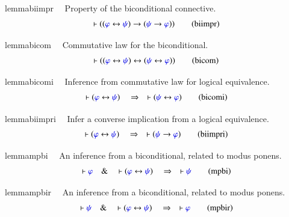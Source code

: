 \begin{restatable}{lemma}{biimpr}~~ Property of the biconditional connective. 
\begin{align}
\vdash ( ( \mw{\varphi} \leftrightarrow \mw{\psi} ) \rightarrow ( \mw{\psi}
    \rightarrow \mw{\varphi} ) )\label{eq:biimpr}\tag{biimpr}
\end{align}
\end{restatable}

\begin{restatable}{lemma}{bicom}~~ Commutative law for the biconditional. 
\begin{align}
\vdash ( ( \mw{\varphi} \leftrightarrow \mw{\psi} ) \leftrightarrow ( \mw{\psi}
    \leftrightarrow \mw{\varphi} ) )\label{eq:bicom}\tag{bicom}
\end{align}
\end{restatable}

\begin{restatable}{lemma}{bicomi}~~ Inference from commutative law for logical
equivalence.
\begin{align}
\vdash ( \mw{\varphi} \leftrightarrow \mw{\psi} )\quad\Rightarrow\quad \vdash (
    \mw{\psi} \leftrightarrow \mw{\varphi} )\label{eq:bicomi}\tag{bicomi}
\end{align}
\end{restatable}

\begin{restatable}{lemma}{biimpri}~~ Infer a converse implication from a logical
equivalence.  
\begin{align}
\vdash ( \mw{\varphi} \leftrightarrow \mw{\psi} )\quad\Rightarrow\quad \vdash (
    \mw{\psi} \rightarrow \mw{\varphi} )\label{eq:biimpri}\tag{biimpri}
\end{align}
\end{restatable}

\begin{restatable}{lemma}{mpbi}~~ An inference from a biconditional, related to
modus ponens.
\begin{align}
\vdash \mw{\varphi}\quad\&\quad \vdash ( \mw{\varphi} \leftrightarrow \mw{\psi}
    )\quad\Rightarrow\quad \vdash \mw{\psi}\label{eq:mpbi}\tag{mpbi}
\end{align}
\end{restatable}

\begin{restatable}{lemma}{mpbir}~~ An inference from a biconditional, related to
modus ponens.
\begin{align}
\vdash \mw{\psi}\quad\&\quad \vdash ( \mw{\varphi} \leftrightarrow \mw{\psi}
    )\quad\Rightarrow\quad \vdash \mw{\varphi}\label{eq:mpbir}\tag{mpbir}
\end{align}
\end{restatable}

